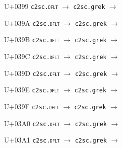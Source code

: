 \documentclass{article}
\begin{document}
\begin{substitutions}
\goodbreak

U+0399  \linebreak
    \texttt{c2sc.\textsc{dflt}} $\to$  \linebreak
    \texttt{c2sc.grek} $\to$  

\goodbreak

U+039A  \linebreak
    \texttt{c2sc.\textsc{dflt}} $\to$  \linebreak
    \texttt{c2sc.grek} $\to$  

\goodbreak

U+039B  \linebreak
    \texttt{c2sc.\textsc{dflt}} $\to$  \linebreak
    \texttt{c2sc.grek} $\to$  

\goodbreak

U+039C  \linebreak
    \texttt{c2sc.\textsc{dflt}} $\to$  \linebreak
    \texttt{c2sc.grek} $\to$  

\goodbreak

U+039D  \linebreak
    \texttt{c2sc.\textsc{dflt}} $\to$  \linebreak
    \texttt{c2sc.grek} $\to$  

\goodbreak

U+039E  \linebreak
    \texttt{c2sc.\textsc{dflt}} $\to$  \linebreak
    \texttt{c2sc.grek} $\to$  

\goodbreak

U+039F  \linebreak
    \texttt{c2sc.\textsc{dflt}} $\to$  \linebreak
    \texttt{c2sc.grek} $\to$  

\goodbreak

U+03A0  \linebreak
    \texttt{c2sc.\textsc{dflt}} $\to$  \linebreak
    \texttt{c2sc.grek} $\to$  

\goodbreak

U+03A1  \linebreak
    \texttt{c2sc.\textsc{dflt}} $\to$  \linebreak
    \texttt{c2sc.grek} $\to$  


\end{substitutions}
\end{document}
